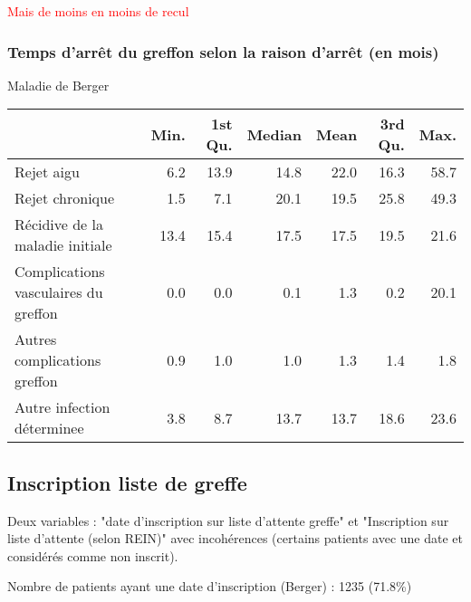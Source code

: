 \documentclass[11pt,a4paper]{article}\usepackage[]{graphicx}\usepackage[]{color}
\begin{document}
\textcolor{red}{Mais de moins en moins de recul}

    \subsubsection{Temps d'arrêt du greffon selon la raison d'arrêt (en mois)}

Maladie de Berger

\begin{table}[H]
\centering
\begin{tabular}{lrrrrrr}
  \hline
 & Min. & 1st Qu. & Median & Mean & 3rd Qu. & Max. \\ 
  \hline
Rejet aigu & 6.2 & 13.9 & 14.8 & 22.0 & 16.3 & 58.7 \\ 
  Rejet chronique & 1.5 & 7.1 & 20.1 & 19.5 & 25.8 & 49.3 \\ 
  Récidive de la maladie initiale & 13.4 & 15.4 & 17.5 & 17.5 & 19.5 & 21.6 \\ 
  Complications vasculaires du greffon & 0.0 & 0.0 & 0.1 & 1.3 & 0.2 & 20.1 \\ 
  Autres complications greffon & 0.9 & 1.0 & 1.0 & 1.3 & 1.4 & 1.8 \\ 
  Autre infection déterminee & 3.8 & 8.7 & 13.7 & 13.7 & 18.6 & 23.6 \\ 
   \hline
\end{tabular}
\end{table}



% 

  \subsection{Inscription liste de greffe}

Deux variables : "date d'inscription sur liste d'attente greffe" et "Inscription sur liste d'attente (selon REIN)" avec incohérences (certains patients avec une date et considérés comme non inscrit).

Nombre de patients ayant une date d'inscription (Berger) : 1235 (71.8\%)
\end{document}
